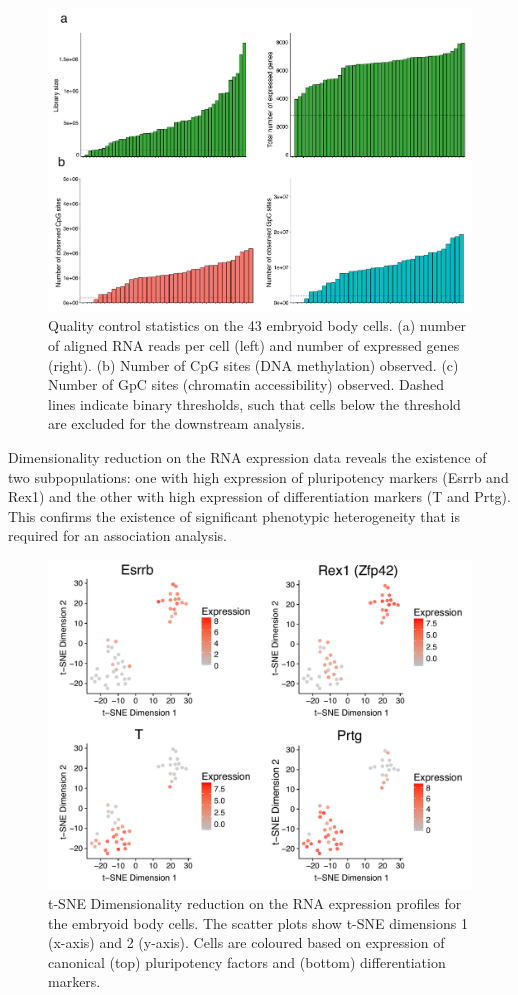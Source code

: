 \begin{figure}[H]
	\centering
	\includegraphics[width=0.8\linewidth]{scNMT_EB_QC}
	\caption[]{Quality control statistics on the 43 embryoid body cells. (a) number of aligned RNA reads per cell (left) and number of expressed genes (right). (b) Number of CpG sites (DNA methylation) observed. (c) Number of GpC sites (chromatin accessibility) observed. Dashed lines indicate binary thresholds, such that cells below the threshold are excluded for the downstream analysis.}
	\label{fig:scnmt_eb_qc}
\end{figure}

Dimensionality reduction on the RNA expression data reveals the existence of two subpopulations: one with high expression of pluripotency markers (Esrrb and Rex1) and the other with high expression of differentiation markers (T and Prtg). This confirms the existence of significant phenotypic heterogeneity that is required for an association analysis.

\begin{figure}[H]
	\centering
	\includegraphics[width=0.8\linewidth]{scNMT_EB_RNA}
	\caption[]{t-SNE Dimensionality reduction on the RNA expression profiles for the embryoid body cells. The scatter plots show t-SNE dimensions 1 (x-axis) and 2 (y-axis). Cells are coloured based on expression of canonical (top) pluripotency factors and (bottom) differentiation markers.  }
	\label{fig:scnmt_eb_rna}
\end{figure}

